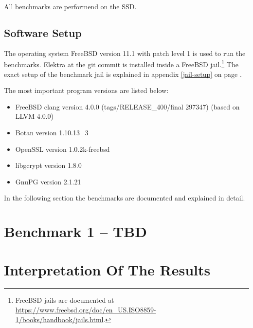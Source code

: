 All benchmarks are performend on the SSD.

  \subsection{Software Setup}

The operating system FreeBSD version 11.1 with patch level 1 is used to run the benchmarks.
Elektra  at the git commit  is installed inside a FreeBSD jail.\footnote{FreeBSD jails
are documented at \url{https://www.freebsd.org/doc/en_US.ISO8859-1/books/handbook/jails.html}.
}
The exact setup of the benchmark jail is explained in appendix \ref{jail-setup} on page \pageref{jail-setup}.

The most important program versions are listed below:

\begin{itemize}
  \item FreeBSD clang version 4.0.0 (tags/RELEASE\_400/final 297347) (based on LLVM 4.0.0)
  \item Botan version 1.10.13\_3
  \item OpenSSL version 1.0.2k-freebsd
  \item libgcrypt version 1.8.0
  \item GnuPG version 2.1.21
\end{itemize}

In the following section the benchmarks are documented and explained in detail.

\section{Benchmark 1 -- TBD}

\section{Interpretation Of The Results}
